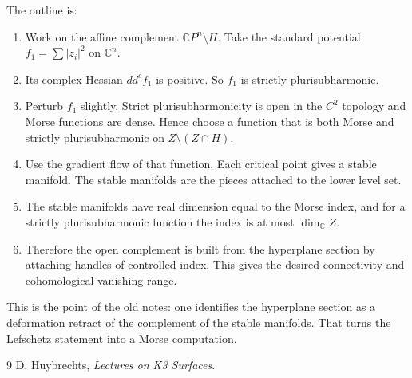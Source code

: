 \begin{remark}
The outline is:
\begin{enumerate}
\item Work on the affine
complement $\mathbb{C}P^n\setminus H$.
Take the standard potential
$f_1=\sum |z_i|^2$ on
$\mathbb{C}^n$.
\item Its complex Hessian
$dd^cf_1$ is positive.
So $f_1$ is strictly
plurisubharmonic.
\item Perturb $f_1$ slightly.
Strict plurisubharmonicity is
open in the $C^2$ topology and
Morse functions are dense.
Hence choose a function that is
both Morse and strictly
plurisubharmonic on
$Z\setminus (Z\cap H)$.
\item Use the gradient flow of
that function.
Each critical point gives a
stable manifold.
The stable manifolds are the
pieces attached to the lower
level set.
\item The stable manifolds have
real dimension equal to the
Morse index, and for a
strictly plurisubharmonic
function the index is at most
$\dim_{\mathbb{C}} Z$.
\item Therefore the open
complement is built from the
hyperplane section by attaching
handles of controlled index.
This gives the desired
connectivity and cohomological
vanishing range.
\end{enumerate}
\end{remark}

\begin{remark}
This is the point of the old
notes: one identifies
the hyperplane section as a
deformation retract of the
complement of the stable
manifolds.
That turns the Lefschetz
statement into a Morse
computation.
\end{remark}

\begin{thebibliography}{9}
D. Huybrechts,
\textit{Lectures on K3 Surfaces}.
\end{thebibliography}


